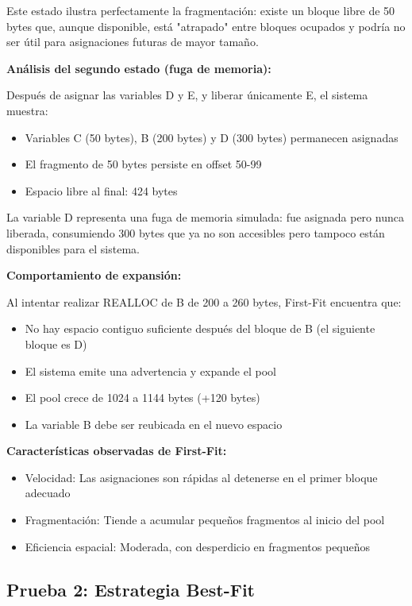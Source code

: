 \documentclass[12pt,a4paper]{article}
\begin{document}
Este estado ilustra perfectamente la fragmentación: existe un bloque libre de 50 bytes que, aunque disponible, está "atrapado" entre bloques ocupados y podría no ser útil para asignaciones futuras de mayor tamaño.

\textbf{Análisis del segundo estado (fuga de memoria):}

Después de asignar las variables D y E, y liberar únicamente E, el sistema muestra:

\begin{itemize}
    \item Variables C (50 bytes), B (200 bytes) y D (300 bytes) permanecen asignadas
    \item El fragmento de 50 bytes persiste en offset 50-99
    \item Espacio libre al final: 424 bytes
\end{itemize}

La variable D representa una fuga de memoria simulada: fue asignada pero nunca liberada, consumiendo 300 bytes que ya no son accesibles pero tampoco están disponibles para el sistema.

\textbf{Comportamiento de expansión:}

Al intentar realizar REALLOC de B de 200 a 260 bytes, First-Fit encuentra que:
\begin{itemize}
    \item No hay espacio contiguo suficiente después del bloque de B (el siguiente bloque es D)
    \item El sistema emite una advertencia y expande el pool
    \item El pool crece de 1024 a 1144 bytes (+120 bytes)
    \item La variable B debe ser reubicada en el nuevo espacio
\end{itemize}

\textbf{Características observadas de First-Fit:}
\begin{itemize}
    \item Velocidad: Las asignaciones son rápidas al detenerse en el primer bloque adecuado
    \item Fragmentación: Tiende a acumular pequeños fragmentos al inicio del pool
    \item Eficiencia espacial: Moderada, con desperdicio en fragmentos pequeños
\end{itemize}

\subsection{Prueba 2: Estrategia Best-Fit}
\end{document}
